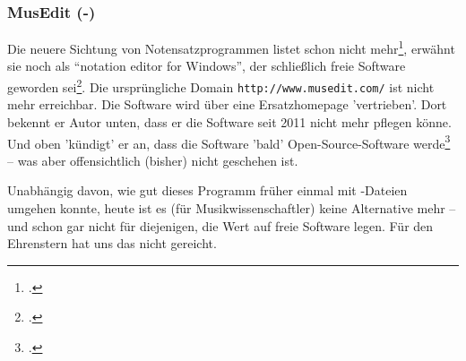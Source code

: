 %
%
%




\subsubsection{MusEdit (-)}

\label{MusEdit}Die neuere Sichtung von Notensatzprogrammen listet 
schon nicht mehr\footcite[vgl.][\nopage wp]{WpedNotensatz2019a}, 
erwähnt sie noch als \enquote{notation editor for Windows}, der schließlich
freie Software geworden sei\footcite[vgl.][\nopage wp]{MusicXML2018b}. Die
ursprüngliche Domain \texttt{http://www.musedit.com/} ist nicht mehr erreichbar.
Die Software wird über eine Ersatzhomepage 'vertrieben'. Dort  bekennt er Autor
unten, dass er die Software seit 2011 nicht mehr pflegen könne. Und oben
'kündigt' er an, dass die Software 'bald' Open-Source-Software
werde\footcite[vgl.][\nopage wp]{Rogers2011a} -- was aber offensichtlich
(bisher) nicht geschehen ist.

Unabhängig davon, wie gut dieses Programm früher einmal mit
-Dateien umgehen konnte, heute ist es (für Musikwissenschaftler)
keine Alternative mehr -- und schon gar nicht für diejenigen, die Wert auf freie
Software legen. Für den Ehrenstern hat uns das nicht gereicht.

%
